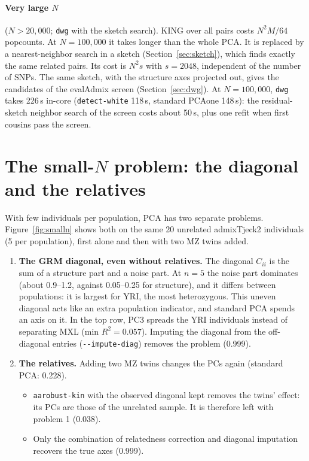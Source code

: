 \documentclass[11pt,a4paper]{article}
\newcommand{\opt}[1]{\texttt{-{}-#1}}
\begin{document}
\paragraph{Very large $N$} ($N>20{,}000$; \texttt{dwg} with the
sketch search). KING over all pairs costs $N^2M/64$ popcounts. At
$N=100{,}000$ it takes longer than the whole PCA. It is replaced by a
nearest-neighbor search in a sketch (Section~\ref{sec:sketch}), which finds
exactly the same related pairs. Its cost is $N^2s$ with $s=2048$, independent
of the number of SNPs. The same sketch, with the structure axes projected
out, gives the candidates of the evalAdmix screen (Section~\ref{sec:dwg}).
At $N=100{,}000$, \texttt{dwg} takes 226\,s in-core (\texttt{detect-white}
118\,s, standard PCAone 148\,s): the residual-sketch neighbor search of the
screen costs about 50\,s, plus one refit when first cousins pass the screen.

\section{The small-$N$ problem: the diagonal and the relatives}
\label{sec:smalln}

With few individuals per population, PCA has two separate problems.
Figure~\ref{fig:smalln} shows both on the same 20 unrelated admixTjeck2
individuals (5 per population), first alone and then with two MZ twins
added.

\begin{enumerate}
  \item \textbf{The GRM diagonal, even without relatives.} The diagonal $C_{ii}$
    is the sum of a structure part and a noise part. At $n=5$ the noise part
    dominates (about 0.9--1.2, against 0.05--0.25 for structure), and it
    differs between populations: it is largest for YRI, the most
    heterozygous. This uneven diagonal acts like an extra population
    indicator, and standard PCA spends an axis on it. In the top row, PC3
    spreads the YRI individuals instead of separating MXL (min $R^2=0.057$).
    Imputing the diagonal from the off-diagonal entries
    (\opt{impute-diag}) removes the problem (0.999).
  \item \textbf{The relatives.} Adding two MZ twins changes the PCs again
    (standard PCA: 0.228).
    \begin{itemize}
      \item \texttt{aarobust-kin} with the observed diagonal kept removes the
        twins' effect: its PCs are those of the unrelated sample. It is
        therefore left with problem 1 (0.038).
      \item Only the combination of relatedness correction and diagonal
        imputation recovers the true axes (0.999).
    \end{itemize}
\end{enumerate}
\end{document}
